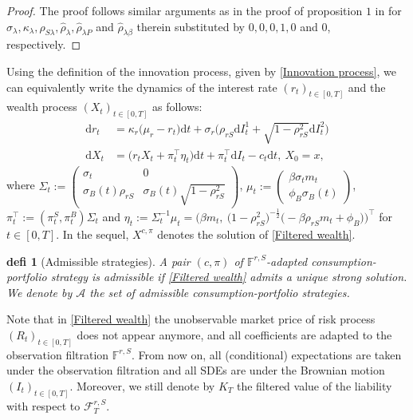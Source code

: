 \documentclass[12,reqno]{amsart}
\numberwithin{equation}{section}
\newtheorem{defi}{defi}[section]
\begin{document}
\begin{proof}
	The proof follows similar arguments as in the proof of proposition $1$ in \cite{escobar2016portfolio} for $\sigma_{\lambda},\kappa_{\lambda},\rho_{S\lambda},\hat{\rho}_{\lambda},\hat{\rho}_{\lambda P}$ and $\hat{\rho}_{\lambda\beta}$ therein substituted by $0,0,0,1,0$ and $0$, respectively.
\end{proof}
Using the definition of the innovation process, given by \eqref{Innovation process}, we can equivalently write the dynamics of the interest rate $(r_{t})_{t\in[0,T]}$ and the wealth process $(X_{t})_{t\in[0,T]}$ as follows:
\begin{align}
	\mathrm{d}r_{t}&=\kappa_{r}\big(\mu_{r}-r_{t}\big)\mathrm{d}t+\sigma_{r}\Big(\rho_{rS}\mathrm{d}I_{t}^{1}+\sqrt{1-\rho_{rS}^{2}}\mathrm{d}I_{t}^{2}\Big)\label{Filtered interest rate}\\
	\mathrm{d}X_{t}&=\Big(r_{t}X_{t}+\pi_{t}^{\top}\eta_{t}\Big)\mathrm{d}t+\pi_{t}^{\top}\mathrm{d}I_{t}-c_{t}\mathrm{d}t,~X_{0}=x,\label{Filtered wealth}
\end{align}
where $\Sigma_{t}:=\begin{pmatrix}
	\sigma_{t} & 0\\ \sigma_{B}(t)\rho_{rS} & \sigma_{B}(t)\sqrt{1-\rho_{rS}^{2}}
\end{pmatrix}$, $\mu_{t}:=\begin{pmatrix}
	\beta\sigma_{t}m_{t}\\ \phi_{B}\sigma_{B}(t)
\end{pmatrix}$, $\pi_{t}^{\top}:=(\pi_{t}^{S},\pi_{t}^{B})\Sigma_{t}$ and $\eta_{t}:=\Sigma_{t}^{-1}\mu_{t}=\big(\beta m_{t},~\big(1-\rho_{rS}^{2}\big)^{-\frac{1}{2}}\big(-\beta\rho_{rS}m_{t}+\phi_{B}\big)\big)^{\top}$ for $t\in[0,T]$. In the sequel, $X^{c,\pi}$ denotes the solution of \eqref{Filtered wealth}.
\begin{defi}[Admissible strategies]
	A pair $(c,\pi)$ of $\mathbb{F}^{r,S}$-adapted consumption-portfolio strategy is \textit{admissible} if \eqref{Filtered wealth} admits a unique strong solution. We denote by $\mathcal{A}$ the set of admissible consumption-portfolio strategies.
\end{defi}
Note that in \eqref{Filtered wealth} the unobservable market price of risk process $(R_{t})_{t\in[0,T]}$ does not appear anymore, and all coefficients are adapted to the observation filtration $\mathbb{F}^{r,S}$. From now on, all (conditional) expectations are taken under the observation filtration and all SDEs are under the Brownian motion $(I_{t})_{t\in[0,T]}$. Moreover, we still denote by $K_{T}$ the filtered value of the liability with respect to $\mathcal{F}_{T}^{r,S}$.
\end{document}
